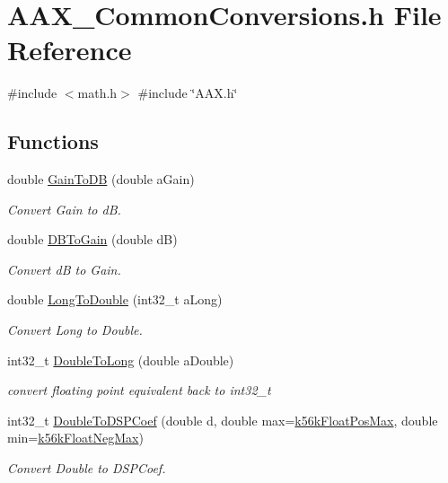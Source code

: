 \hypertarget{a00449}{}\section{A\+A\+X\+\_\+\+Common\+Conversions.\+h File Reference}
\label{a00449}
{\ttfamily \#include $<$math.\+h$>$}\newline
{\ttfamily \#include \char`\"{}A\+A\+X.\+h\char`\"{}}\newline
\subsection*{Functions}
\begin{DoxyCompactItemize}
\item 
double \mbox{\hyperlink{a00449_a76f29f12e35c093e5c198b8d0e27b6f9}{Gain\+To\+DB}} (double a\+Gain)
\begin{DoxyCompactList}\small\item\em Convert Gain to dB. \end{DoxyCompactList}\item 
double \mbox{\hyperlink{a00449_a596d5ea393d43f6f798a838aefe3cecd}{D\+B\+To\+Gain}} (double dB)
\begin{DoxyCompactList}\small\item\em Convert dB to Gain. \end{DoxyCompactList}\item 
double \mbox{\hyperlink{a00449_a463cbd4685551c74125ff89060de20cd}{Long\+To\+Double}} (int32\+\_\+t a\+Long)
\begin{DoxyCompactList}\small\item\em Convert Long to Double. \end{DoxyCompactList}\item 
int32\+\_\+t \mbox{\hyperlink{a00449_a59b4dba8d35a4837ab0afe3886bec74a}{Double\+To\+Long}} (double a\+Double)
\begin{DoxyCompactList}\small\item\em convert floating point equivalent back to int32\+\_\+t \end{DoxyCompactList}\item 
int32\+\_\+t \mbox{\hyperlink{a00449_a1567c2393df9139b20166027d0127195}{Double\+To\+D\+S\+P\+Coef}} (double d, double max=\mbox{\hyperlink{a00449_abc7ad084f4b51c70feeac700ab05f7a5}{k56k\+Float\+Pos\+Max}}, double min=\mbox{\hyperlink{a00449_ae1518eaa8f13def92b4c9daeedbbe002}{k56k\+Float\+Neg\+Max}})
\begin{DoxyCompactList}\small\item\em Convert Double to D\+S\+P\+Coef. \end{DoxyCompactList}\item 

\end{DoxyCompactItemize}
